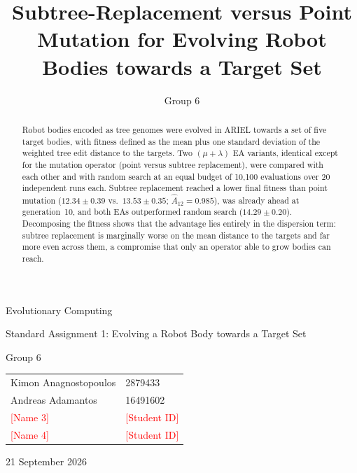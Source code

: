 \documentclass[sigconf]{acmart}
\newcommand{\groupnumber}{6}
\newcommand{\todo}[1]{\textcolor{red}{[#1]}}
\begin{document}
\onecolumn
\thispagestyle{empty}
\begin{center}
  \vspace*{0.2\textheight}
  {\LARGE Evolutionary Computing\par}
  \vspace{1.5em}
  {\Large Standard Assignment 1: Evolving a Robot Body towards a Target Set\par}
  \vspace{2.5em}
  {\large Group \groupnumber\par}
  \vspace{1.5em}
  \begin{tabular}{ll}
    Kimon Anagnostopoulos & 2879433 \\
    Andreas Adamantos & 16491602 \\
    \todo{Name 3} & \todo{Student ID} \\
    \todo{Name 4} & \todo{Student ID} \\
  \end{tabular}
  \par\vfill
  {\large 21 September 2026\par}
\end{center}
\clearpage
\setcounter{page}{1}

\title{Subtree-Replacement versus Point Mutation for Evolving Robot Bodies towards a Target Set}
\author{Group \groupnumber}

\begin{abstract}
Robot bodies encoded as tree genomes were evolved in ARIEL towards a set of five target bodies, with fitness defined as the mean plus one standard deviation of the weighted tree edit distance to the targets.
Two $(\mu+\lambda)$ EA variants, identical except for the mutation operator (point versus subtree replacement), were compared with each other and with random search at an equal budget of 10{,}100 evaluations over 20 independent runs each.
Subtree replacement reached a lower final fitness than point mutation ($12.34 \pm 0.39$ vs.\ $13.53 \pm 0.35$; $\hat{A}_{12} = 0.985$), was already ahead at generation~10, and both EAs outperformed random search ($14.29 \pm 0.20$).
Decomposing the fitness shows that the advantage lies entirely in the dispersion term: subtree replacement is marginally worse on the mean distance to the targets and far more even across them, a compromise that only an operator able to grow bodies can reach.
\end{abstract}
\end{document}
